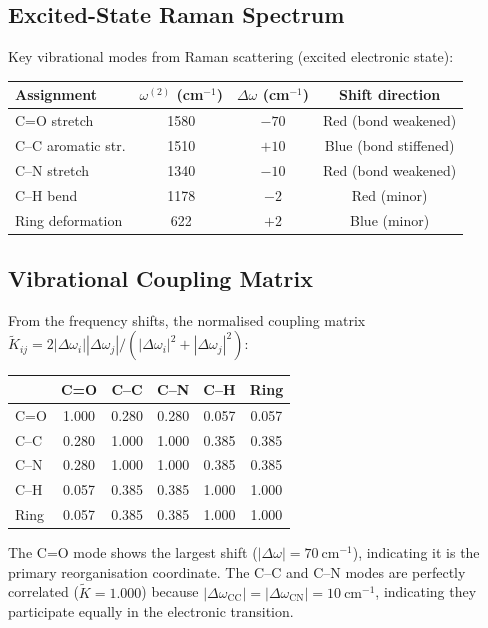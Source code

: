 \documentclass[11pt,a4paper]{article}
\theoremstyle{definition}
\theoremstyle{remark}
\begin{document}
\subsection{Excited-State Raman Spectrum}

Key vibrational modes from Raman scattering (excited electronic state):
\begin{center}
\begin{tabular}{lccc}
\toprule
Assignment & $\omega^{(2)}$ (cm$^{-1}$) & $\Delta\omega$ (cm$^{-1}$) & Shift direction \\
\midrule
C=O stretch       & 1580 & $-70$ & Red (bond weakened) \\
C--C aromatic str. & 1510 & $+10$ & Blue (bond stiffened) \\
C--N stretch       & 1340 & $-10$ & Red (bond weakened) \\
C--H bend          & 1178 & $-2$  & Red (minor) \\
Ring deformation   & 622  & $+2$  & Blue (minor) \\
\bottomrule
\end{tabular}
\end{center}

\subsection{Vibrational Coupling Matrix}

From the frequency shifts, the normalised coupling matrix $\tilde{K}_{ij} = 2|\Delta\omega_i||\Delta\omega_j|/(|\Delta\omega_i|^2 + |\Delta\omega_j|^2)$:

\begin{center}
\begin{tabular}{lccccc}
\toprule
 & C=O & C--C & C--N & C--H & Ring \\
\midrule
C=O  & 1.000 & 0.280 & 0.280 & 0.057 & 0.057 \\
C--C & 0.280 & 1.000 & 1.000 & 0.385 & 0.385 \\
C--N & 0.280 & 1.000 & 1.000 & 0.385 & 0.385 \\
C--H & 0.057 & 0.385 & 0.385 & 1.000 & 1.000 \\
Ring & 0.057 & 0.385 & 0.385 & 1.000 & 1.000 \\
\bottomrule
\end{tabular}
\end{center}

The C=O mode shows the largest shift ($|\Delta\omega| = 70~\mathrm{cm}^{-1}$), indicating it is the primary reorganisation coordinate. The C--C and C--N modes are perfectly correlated ($\tilde{K} = 1.000$) because $|\Delta\omega_{\mathrm{CC}}| = |\Delta\omega_{\mathrm{CN}}| = 10~\mathrm{cm}^{-1}$, indicating they participate equally in the electronic transition.
\end{document}
